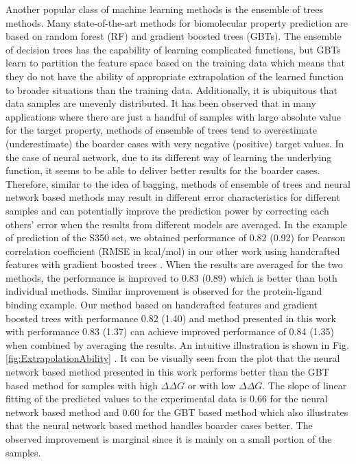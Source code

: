\documentclass[10pt]{article}
\begin{document}
Another popular class of machine learning methods is the ensemble of trees methods. Many state-of-the-art methods for biomolecular property prediction are based on random forest (RF) and gradient boosted trees (GBTs). The ensemble of decision trees has the capability of learning complicated functions, but GBTs learn to partition the feature space based on the training data which means that they do not have the ability of appropriate extrapolation of the learned function to broader situations than the training data. Additionally, it is ubiquitous that  data samples are unevenly distributed. It has been observed that in many applications where there are just a handful of samples with large absolute value for the target property, methods of ensemble of trees  tend to overestimate (underestimate) the boarder cases with very negative (positive) target values. In the case of neural network, due to its different way of learning the underlying function, it seems to be able to deliver better results for the boarder cases. Therefore, similar to the idea of bagging, methods of ensemble of trees and neural network based methods may result in different error characteristics for different samples and can potentially improve the prediction power by correcting each others' error when the results from different models are averaged. In the example of prediction of the S350 set, we obtained performance of 0.82 (0.92) for Pearson correlation coefficient (RMSE in kcal/mol) in our other work using handcrafted features with gradient boosted trees \cite{ZXCang:2017a}. When the results are averaged for the two methods, the performance is improved to 0.83 (0.89) which is better than both individual methods. Similar improvement is observed for the protein-ligand binding example. Our method based on handcrafted features and gradient boosted trees with performance 0.82 (1.40) \cite{ZXCang:2017b} and method presented in this work with performance 0.83 (1.37) can achieve improved performance of 0.84 (1.35) when combined by averaging the results. An intuitive illustration is shown in Fig. \ref{fig:ExtrapolationAbility} . It can be visually seen from the plot that the neural network based method presented in this work performs better than the GBT based method for samples with high $\Delta\Delta G$ or with low $\Delta\Delta G$. The slope of linear fitting of the predicted values to the experimental data is 0.66 for the neural network based method and 0.60 for the GBT based method which also illustrates that the neural network based method handles boarder cases better. The observed improvement is marginal since it is mainly on a small portion of the samples. 
\end{document}
